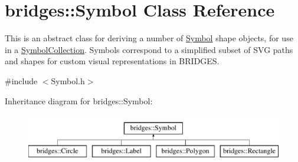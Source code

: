 \hypertarget{classbridges_1_1_symbol}{}\section{bridges\+:\+:Symbol Class Reference}
\label{classbridges_1_1_symbol}


This is an abstract class for deriving a number of \mbox{\hyperlink{classbridges_1_1_symbol}{Symbol}} shape objects, for use in a \mbox{\hyperlink{classbridges_1_1_symbol_collection}{Symbol\+Collection}}. Symbols correspond to a simplified subset of S\+VG paths and shapes for custom visual representations in B\+R\+I\+D\+G\+ES.  




{\ttfamily \#include $<$Symbol.\+h$>$}

Inheritance diagram for bridges\+:\+:Symbol\+:\begin{figure}[H]
\begin{center}
\leavevmode
\includegraphics[height=2.000000cm]{classbridges_1_1_symbol}
\end{center}
\end{figure}
